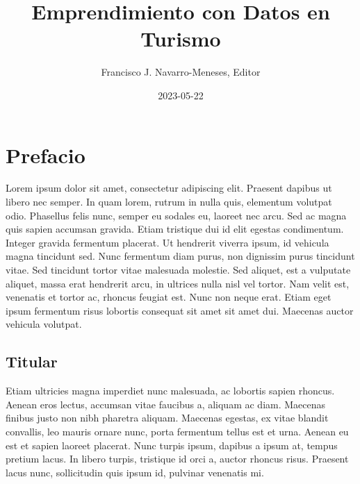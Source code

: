 \documentclass[
  letterpaper,
  DIV=11,
  numbers=noendperiod]{scrreprt}
\title{Emprendimiento con Datos en Turismo}
\author{Francisco J. Navarro-Meneses, Editor}
\date{2023-05-22}
\renewcommand*\contentsname{Table of contents}
\newcommand\contentsname{Table of contents}
\begin{document}
\maketitle
\ifdefined\Shaded\renewenvironment{Shaded}{\begin{tcolorbox}[interior hidden, enhanced, breakable, frame hidden, borderline west={3pt}{0pt}{shadecolor}, boxrule=0pt, sharp corners]}{\end{tcolorbox}}\fi

\renewcommand*\contentsname{Table of contents}
{
\hypersetup{linkcolor=}
\setcounter{tocdepth}{2}
\tableofcontents
}

\hypertarget{prefacio}{%
\chapter*{Prefacio}\label{prefacio}}


Lorem ipsum dolor sit amet, consectetur adipiscing elit. Praesent
dapibus ut libero nec semper. In quam lorem, rutrum in nulla quis,
elementum volutpat odio. Phasellus felis nunc, semper eu sodales eu,
laoreet nec arcu. Sed ac magna quis sapien accumsan gravida. Etiam
tristique dui id elit egestas condimentum. Integer gravida fermentum
placerat. Ut hendrerit viverra ipsum, id vehicula magna tincidunt sed.
Nunc fermentum diam purus, non dignissim purus tincidunt vitae. Sed
tincidunt tortor vitae malesuada molestie. Sed aliquet, est a vulputate
aliquet, massa erat hendrerit arcu, in ultrices nulla nisl vel tortor.
Nam velit est, venenatis et tortor ac, rhoncus feugiat est. Nunc non
neque erat. Etiam eget ipsum fermentum risus lobortis consequat sit amet
sit amet dui. Maecenas auctor vehicula volutpat.

\hypertarget{titular}{%
\section*{Titular}\label{titular}}


Etiam ultricies magna imperdiet nunc malesuada, ac lobortis sapien
rhoncus. Aenean eros lectus, accumsan vitae faucibus a, aliquam ac diam.
Maecenas finibus justo non nibh pharetra aliquam. Maecenas egestas, ex
vitae blandit convallis, leo mauris ornare nunc, porta fermentum tellus
est et urna. Aenean eu est et sapien laoreet placerat. Nunc turpis
ipsum, dapibus a ipsum at, tempus pretium lacus. In libero turpis,
tristique id orci a, auctor rhoncus risus. Praesent lacus nunc,
sollicitudin quis ipsum id, pulvinar venenatis mi.
\end{document}
